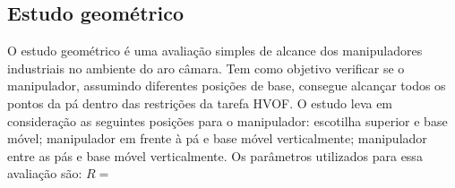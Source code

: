 \subsection{Estudo geométrico}
O estudo geométrico é uma avaliação simples de alcance dos manipuladores
industriais no ambiente do aro câmara. Tem como objetivo verificar se o
manipulador, assumindo diferentes posições de base, consegue alcançar
todos os pontos da pá dentro das restrições da tarefa HVOF. O estudo leva em
consideração as seguintes posições para o manipulador: escotilha superior e base
móvel; manipulador em frente à pá e base móvel verticalmente; manipulador entre
as pás e base móvel verticalmente. Os parâmetros utilizados para essa avaliação
são: $R = $
